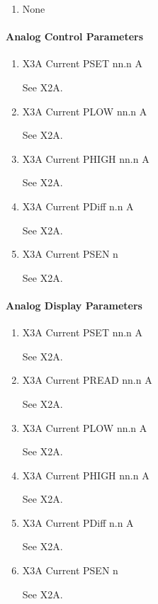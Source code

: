 \documentclass[11pt]{book}		%
\begin{document}
\begin{enumerate}
 \item None
\end{enumerate}

\paragraph{Analog Control Parameters}

\begin{enumerate}
 \item X3A Current PSET   nn.n A

\color{red}
See X2A.
\color{black}

 \item X3A Current PLOW   nn.n A

\color{red}
See X2A.
\color{black}

 \item X3A Current PHIGH  nn.n A

\color{red}
See X2A.
\color{black}

 \item X3A Current PDiff n.n A

\color{red}
See X2A.
\color{black}

 \item X3A Current PSEN  n

\color{red}
See X2A.
\color{black}

\end{enumerate}

\paragraph{Analog Display Parameters}

\begin{enumerate}
 \item X3A Current PSET   nn.n A

\color{red}
See X2A.
\color{black}

 \item X3A Current PREAD  nn.n A

\color{red}
See X2A.
\color{black}

 \item X3A Current PLOW   nn.n A

\color{red}
See X2A.
\color{black}

 \item X3A Current PHIGH  nn.n A

\color{red}
See X2A.
\color{black}

 \item X3A Current PDiff n.n A

\color{red}
See X2A.
\color{black}

 \item X3A Current PSEN  n

\color{red}
See X2A.
\color{black}

\end{enumerate}
\end{document}
